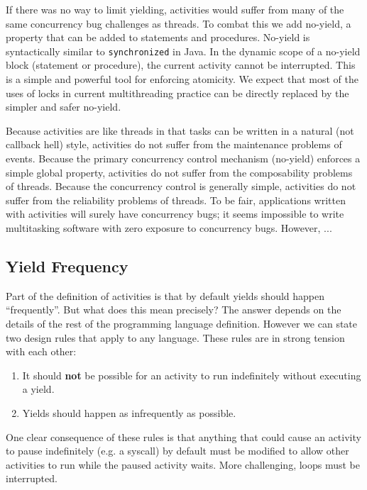 \documentclass[10pt,preprint]{sigplanconf}
\begin{document}
If there was no way to limit yielding, activities would suffer from many of the same concurrency bug challenges as threads.
To combat this we add no-yield, a property that can be added to statements and procedures.
No-yield is syntactically similar to \texttt{synchronized} in Java.
In the dynamic scope of a no-yield block (statement or procedure), the current activity cannot be interrupted.
This is a simple and powerful tool for enforcing atomicity.
We expect that most of the uses of locks in current multithreading practice can be directly replaced by the simpler and safer no-yield.

Because activities are like threads in that tasks can be written in a natural (not callback hell) style, activities do not suffer from the maintenance problems of events.
Because the primary concurrency control mechanism (no-yield) enforces a simple global property, activities do not suffer from the composability problems of threads.
Because the concurrency control is generally simple, activities do not suffer from the reliability problems of threads.
To be fair, applications written with activities will surely have concurrency bugs; it seems impossible to write multitasking software with zero exposure to concurrency bugs.
However, ...

\subsection{Yield Frequency}

Part of the definition of activities is that by default yields should happen ``frequently''.
But what does this mean precisely?
The answer depends on the details of the rest of the programming language definition.
However we can state two design rules that apply to any language.
These rules are in strong tension with each other:

\begin{enumerate}
\item It should \textbf{not} be possible for an activity to run indefinitely without executing a yield.
\item Yields should happen as infrequently as possible.
\end{enumerate}

One clear consequence of these rules is that anything that could cause an activity to pause indefinitely (e.g. a syscall) by default must be modified to allow other activities to run while the paused activity waits.
More challenging, loops must be interrupted.
\end{document}
